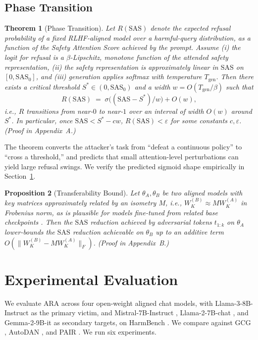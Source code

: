 \documentclass[sigconf,anonymous=false,review=false]{acmart}
\newtheorem{theorem}{Theorem}
\newtheorem{proposition}[theorem]{Proposition}
\theoremstyle{definition}
\theoremstyle{remark}
\newcommand{\SAS}{\mathrm{SAS}}
\begin{document}
\subsection{Phase Transition}

\begin{theorem}[Phase Transition]
\label{thm:phase}
Let $R(\SAS)$ denote the expected refusal probability of a fixed RLHF-aligned model over a harmful-query distribution, as a function of the Safety Attention Score achieved by the prompt. Assume (i) the logit for refusal is a $\beta$-Lipschitz, monotone function of the attended safety representation, (ii) the safety representation is approximately linear in $\SAS$ on $[0,\SAS_0]$, and (iii) generation applies softmax with temperature $T_{\mathrm{gen}}$. Then there exists a critical threshold $S^* \in (0,\SAS_0)$ and a width $w = O(T_{\mathrm{gen}}/\beta)$ such that
\[
R(\SAS) \;=\; \sigma\!\big( (\SAS - S^*)/w \big) + O(w),
\]
i.e., $R$ transitions from near-$0$ to near-$1$ over an interval of width $O(w)$ around $S^*$. In particular, once $\SAS < S^* - cw$, $R(\SAS) < \varepsilon$ for some constants $c,\varepsilon$. (Proof in Appendix~A.)
\end{theorem}

The theorem converts the attacker's task from ``defeat a continuous policy'' to ``cross a threshold,'' and predicts that small attention-level perturbations can yield large refusal swings. We verify the predicted sigmoid shape empirically in Section~\ref{sec:experiments}.

\begin{proposition}[Transferability Bound]
\label{prop:transfer}
Let $\theta_A, \theta_B$ be two aligned models with key matrices approximately related by an isometry $M$, i.e., $W_K^{(B)} \approx M W_K^{(A)}$ in Frobenius norm, as is plausible for models fine-tuned from related base checkpoints \cite{artetxe2018robust}. Then the $\SAS$ reduction achieved by adversarial tokens $t_{1:k}$ on $\theta_A$ lower-bounds the $\SAS$ reduction achievable on $\theta_B$ up to an additive term $O(\|W_K^{(B)} - M W_K^{(A)}\|_F)$. (Proof in Appendix~B.)
\end{proposition}

\section{Experimental Evaluation}
\label{sec:experiments}

We evaluate ARA across four open-weight aligned chat models, with Llama-3-8B-Instruct \cite{grattafiori2024llama3} as the primary victim, and Mistral-7B-Instruct \cite{jiang2023mistral}, Llama-2-7B-chat \cite{touvron2023llama2}, and Gemma-2-9B-it \cite{gemmateam2024gemma2} as secondary targets, on HarmBench \cite{mazeika2024harmbench}. We compare against GCG \cite{zou2023universal}, AutoDAN \cite{liu2023autodan}, and PAIR \cite{chao2023pair}. We run six experiments.
\end{document}
